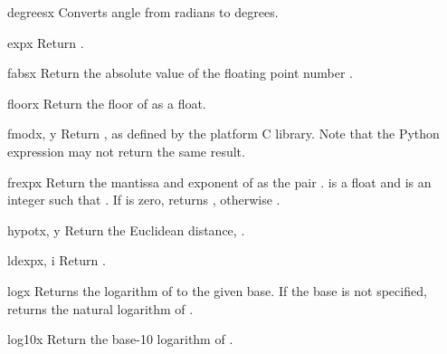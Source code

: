 \begin{funcdesc}{degrees}{x}
Converts angle  from radians to degrees.
\end{funcdesc}

\begin{funcdesc}{exp}{x}
Return .
\end{funcdesc}

\begin{funcdesc}{fabs}{x}
Return the absolute value of the floating point number .
\end{funcdesc}

\begin{funcdesc}{floor}{x}
Return the floor of  as a float.
\end{funcdesc}

\begin{funcdesc}{fmod}{x, y}
Return , as defined by the platform C library.
Note that the Python expression  may not return
the same result.
\end{funcdesc}

\begin{funcdesc}{frexp}{x}
Return the mantissa and exponent of  as the pair
.   is a float and  is an
integer such that .
If  is zero, returns , otherwise
.
\end{funcdesc}

\begin{funcdesc}{hypot}{x, y}
Return the Euclidean distance, .
\end{funcdesc}

\begin{funcdesc}{ldexp}{x, i}
Return .
\end{funcdesc}

\begin{funcdesc}{log}{x}
Returns the logarithm of  to the given base.
If the base is not specified, returns the natural logarithm of .
\end{funcdesc}

\begin{funcdesc}{log10}{x}
Return the base-10 logarithm of .
\end{funcdesc}

